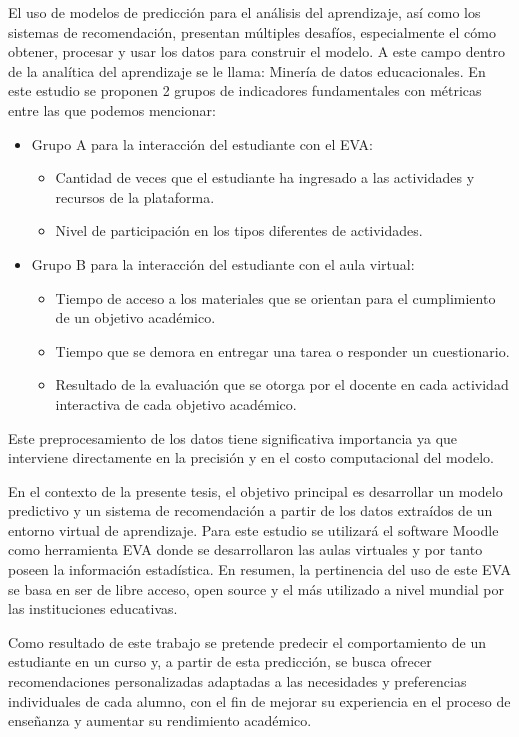 El uso de modelos de predicción para el análisis del aprendizaje, así como los sistemas de recomendación, presentan múltiples desafíos, especialmente el cómo obtener, procesar y usar los datos para construir el modelo. A este campo dentro de la analítica del aprendizaje se le llama: Minería de datos educacionales. En este estudio se proponen 2 grupos de indicadores fundamentales con métricas entre las que podemos mencionar: 
\begin{itemize}
    \item Grupo A para la interacción del estudiante con el EVA:
    \begin{itemize}
        \item Cantidad de veces que el estudiante ha ingresado a las actividades y recursos de la plataforma.
        \item Nivel de participación en los tipos diferentes de actividades.
    \end{itemize}
    \item Grupo B para la interacción del estudiante con el aula virtual:
    \begin{itemize}
        \item Tiempo de acceso a los materiales que se orientan para el cumplimiento de un objetivo académico.
        \item Tiempo que se demora en entregar una tarea o responder un cuestionario.
        \item Resultado de la evaluación que se otorga por el docente en cada actividad interactiva de cada objetivo académico.
    \end{itemize}
\end{itemize}

Este preprocesamiento de los datos tiene significativa importancia ya que interviene directamente en la precisión y en el costo computacional del modelo.

En el contexto de la presente tesis, el objetivo principal es desarrollar un modelo predictivo y un sistema de recomendación a partir de los datos extraídos de un entorno virtual de aprendizaje. Para este estudio se utilizará el software Moodle como herramienta EVA donde se desarrollaron las aulas virtuales y por tanto poseen la información estadística. En resumen, la pertinencia del uso de este EVA se basa en ser de libre acceso, open source y el más utilizado a nivel mundial por las instituciones educativas. 

Como resultado de este trabajo se pretende predecir el comportamiento de un estudiante en un curso y, a partir de esta predicción, se busca ofrecer recomendaciones personalizadas adaptadas a las necesidades y preferencias individuales de cada alumno, con el fin de mejorar su experiencia en el proceso de enseñanza y aumentar su rendimiento académico.

